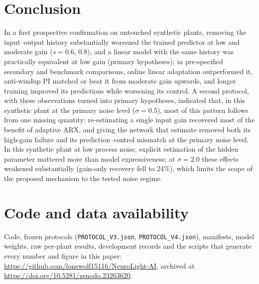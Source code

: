 \documentclass[11pt]{article}
\begin{document}
\section{Conclusion}
In a first prospective confirmation on untouched synthetic plants, removing the input--output history substantially worsened the trained predictor at low and moderate gain ($s=0.6$, $0.8$), and a linear model with the same history was practically equivalent at low gain (primary hypotheses); in pre-specified secondary and benchmark comparisons, online linear adaptation outperformed it, anti-windup PI matched or beat it from moderate gain upwards, and longer training improved its predictions while worsening its control. A second protocol, with these observations turned into primary hypotheses, indicated that, in this synthetic plant at the primary noise level ($\sigma=0.5$), most of this pattern follows from one missing quantity: re-estimating a single input gain recovered most of the benefit of adaptive ARX, and giving the network that estimate removed both its high-gain failure and its prediction--control mismatch at the primary noise level. In this synthetic plant at low process noise, explicit estimation of the hidden parameter mattered more than model expressiveness; at $\sigma=2.0$ these effects weakened substantially (gain-only recovery fell to 24\%), which limits the scope of the proposed mechanism to the tested noise regime.

\section*{Code and data availability}
\begin{sloppypar}
Code, frozen protocols (\texttt{PROTOCOL\_V3.json}, \texttt{PROTOCOL\_V4.json}), manifests, model weights, raw per-plant results, development records and the scripts that generate every number and figure in this paper: \url{https://github.com/lonewolf15116/NeuroLight-AI}, archived at \url{https://doi.org/10.5281/zenodo.23263620}.
\end{sloppypar}
\end{document}
